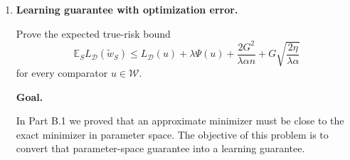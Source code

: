 \documentclass[11pt]{article}
\newcommand{\E}{\mathbb{E}}
\begin{document}
\begin{enumerate}
\begin{solutionbox}
Substituting this into the previous inequality,
\[
\|\widetilde w_S-\widetilde w_{S'}\|
\le
\frac{2G}{\lambda\alpha n}
+
2\sqrt{\frac{2\eta}{\lambda\alpha}}.
\]

\medskip

\textbf{Step 5: Convert parameter movement into loss movement.}

Using the Lipschitz bound from Step 1,
\[
|\ell(\widetilde w_S,z)-\ell(\widetilde w_{S'},z)|
\le
G\|\widetilde w_S-\widetilde w_{S'}\|.
\]

Substitute the distance bound:
\[
|\ell(\widetilde w_S,z)-\ell(\widetilde w_{S'},z)|
\le
G
\left(
\frac{2G}{\lambda\alpha n}
+
2\sqrt{\frac{2\eta}{\lambda\alpha}}
\right).
\]

Distribute $G$:
\[
|\ell(\widetilde w_S,z)-\ell(\widetilde w_{S'},z)|
\le
\frac{2G^2}{\lambda\alpha n}
+
2G\sqrt{\frac{2\eta}{\lambda\alpha}}.
\]

Therefore,
\[
\boxed{
|\ell(\widetilde w_S,z)-\ell(\widetilde w_{S'},z)|
\le
\frac{2G^2}{\lambda\alpha n}
+
2G\sqrt{\frac{2\eta}{\lambda\alpha}}
}.
\]

\medskip

\textbf{Interpretation.}

The first term,
\[
\frac{2G^2}{\lambda\alpha n},
\]
is the usual stability term for exact RERM.

The second term,
\[
2G\sqrt{\frac{2\eta}{\lambda\alpha}},
\]
is the additional cost caused by approximate optimization.

When $\eta=0$, the approximate minimizers equal the exact minimizers, and the bound reduces to the exact RERM stability bound.

\end{solutionbox}

\item \textbf{Learning guarantee with optimization error.}

Prove the expected true-risk bound
\[
\E_SL_{\mathcal D}(\widetilde w_S)
\le
L_{\mathcal D}(u)+\lambda\Psi(u)+\frac{2G^2}{\lambda\alpha n}
+G\sqrt{\frac{2\eta}{\lambda\alpha}}
\]
for every comparator $u\in\mathcal W$.

\begin{solutionbox}

\textbf{Goal.}

In Part B.1 we proved that an approximate minimizer must be close to the exact minimizer in parameter space. The objective of this problem is to convert that parameter-space guarantee into a learning guarantee.


\end{solutionbox}
\end{enumerate}
\end{document}
